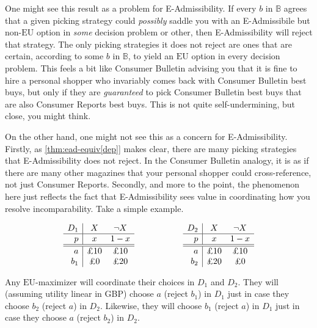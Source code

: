 \documentclass[a4paper]{article}
\newcommand\EU{\mathrm{EU}}
\newcommand{\IB}{\mathbb{B}}
\newcommand{\pb}{b}
\renewcommand{\color}[1]{}
\newenvironment{CCM rewritten}
{\begingroup\color{blue}} %
{\endgroup}              %
\begin{document}
{{\color{red} One might see this result as a problem for E-Admissibility. If every $\pb$ in $\IB$ agrees that a given picking strategy could \textit{possibly} saddle you with an E-Admissibile but non-$\EU$ option in \textit{some} decision problem or other, then E-Admissibility will reject that strategy. The only picking strategies it does not reject are ones that are certain, according to some $\pb$ in $\IB$, to yield an $\EU$ option in every decision problem. This feels a bit like Consumer Bulletin advising you that it is fine to hire a personal shopper who invariably comes back with Consumer Bulletin best buys, but only if they are \textit{guaranteed} to pick Consumer Bulletin best buys that are also Consumer Reports best buys. This is not quite self-undermining, but close, you might think.
	
	
	On the other hand, one might not see this as a concern for E-Admissibility. Firstly, as \cref{thm:ead-equiv[dep]} makes clear, there are many picking strategies that E-Admissibility does not reject. In the Consumer Bulletin analogy, it is as if there are many other magazines that your personal shopper could cross-reference, not just Consumer Reports. Secondly, and more to the point, the phenomenon here just reflects the fact that E-Admissibility sees value in coordinating how you resolve incomparability. Take a simple example.
	
	
	$$
	\begin{array}{r|cc}
		D_1 & X & \neg X  \\
		\hline
		p & x & 1-x \\
		\hline
		\hline
		a & \text{\pounds 10} & \text{\pounds 10}   \\
		b_1 & \text{\pounds 0} & \text{\pounds 20} 
	\end{array}\hspace{20mm}
	\begin{array}{r|cc}
		D_2 & X & \neg X  \\
		\hline
		p & x & 1-x \\
		\hline
		\hline
		a & \text{\pounds 10} & \text{\pounds 10}   \\
		b_2 & \text{\pounds 20} & \text{\pounds 0} 
	\end{array}
	$$
	
	Any $\EU$-maximizer will coordinate their choices in $D_1$ and $D_2$. They will (assuming utility linear in GBP) choose $a$ (reject $b_1$) in $D_1$ just in case they choose $b_2$ (reject $a$) in $D_2$. Likewise, they will choose $b_1$ (reject $a$) in $D_1$ just in case they choose $a$ (reject $b_2$) in $D_2$. 
	
}}
\end{document}
